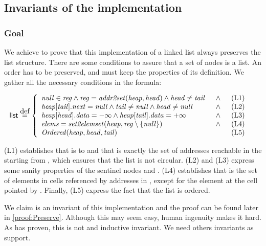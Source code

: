 \subsection{Invariants of the implementation}

\subsubsection{Goal}

We achieve to prove that this implementation of a linked list always preserves the list structure. 
%
There are some conditions to assure that a set of nodes is a list.
%
An order has to be preserved, \head and \tail must keep the properties of its definition. 
%
We gather all the necessary conditions in the formula:


\[
	\begin{align*}
	  	\invPreserve & \overset{\mbox{def}}{=} \formulaFullListReducedBody
	\end{align*}
\]

(L1) establishes that \fNull is to \region and that \region is
exactly the set of addresses reachable in the \heap starting from
\head, which ensures that the list is not circular.
%
(L2) and (L3) express some sanity properties of the sentinel nodes
\head and \tail.
%
(L4) establishes that \elements is the set of elements in cells 
referenced by addresses in \region, except for the element at the cell 
pointed by \fNull.
%
Finally, (L5) express the fact that the list is ordered.

We claim \invPreserve is an invariant of this implementation and the proof can be found later in \ref{proof:Preserve}. 
%
Although this may seem easy, human ingenuity makes it hard. 
%
As  has proven, this is not and inductive invariant. 
%
We need others invariants as support.


